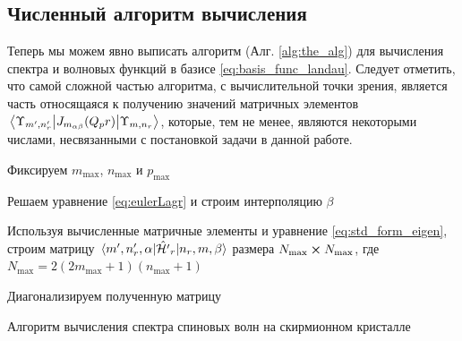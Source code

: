 \documentclass[a4paper,article,14pt]{extarticle}
\begin{document}
\subsection{ Численный алгоритм вычисления }

Теперь мы можем явно выписать алгоритм (Алг. \ref{alg:the_alg}) для вычисления спектра и волновых функций в базисе \eqref{eq:basis_func_landau}. Следует отметить, что самой сложной частью алгоритма, с вычислительной точки зрения, является часть относящаяся к получению  значений матричных элементов $\mel{\Upsilon_{m', n'_r}} {J_{m_{\alpha \beta}} (Q_p r) }{\Upsilon_{m, n_r}}$, которые, тем не менее, являются некоторыми числами, несвязанными с постановкой задачи в данной работе. 

\begin{algorithm}[ht]
 \SetAlgoLined
 Фиксируем $m_\text{max}$, $n_\text{max}$ и $p_\text{max}$

Решаем уравнение \eqref{eq:eulerLagr} и строим интерполяцию $\beta$

Используя вычисленные матричные элементы и уравнение \eqref{eq:std_form_eigen}, строим матрицу $\mel{m', n'_r, \alpha}{\hat {\cal H'}_{r}}{n_r,m, \beta}$ размера $N_\text{max} \cross N_\text{max}$, где  $N_\text{max}=2 (2 m_\text{max} + 1) (n_\text{max} + 1)$

Диагонализируем полученную матрицу 

\caption{Алгоритм вычисления спектра спиновых волн на скирмионном кристалле}\label{alg:the_alg}
\end{algorithm}
\end{document}
